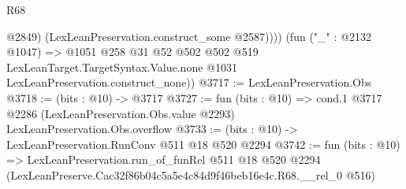 \begin{lexlean}{R68}
\begin{coremodule}
              @2849)
            (LexLeanPreservation.construct_some @2587))))
      (fun ("_" : @2132 @1047) =>
      @1051
        @258
        @31
        @52
        @502
        @502
        @519
        LexLeanTarget.TargetSyntax.Value.none
        @1031
        LexLeanPreservation.construct_none))
@3717 := LexLeanPreservation.Obs
@3718 := (bits : @10) -> @3717
@3727 := fun (bits : @10) =>
  cond.{1} @3717 @2286 (LexLeanPreservation.Obs.value @2293) LexLeanPreservation.Obs.overflow
@3733 := (bits : @10) -> LexLeanPreservation.RunConv @511 @18 @520 @2294
@3742 := fun (bits : @10) =>
  LexLeanPreservation.run_of_funRel
    @511
    @18
    @520
    @2294
    (LexLeanPreserve.Cac32f86b04c5a5e4c84d9f46beb16e4c.R68.__rel_0 @516)
\end{coremodule}
\end{lexlean}
